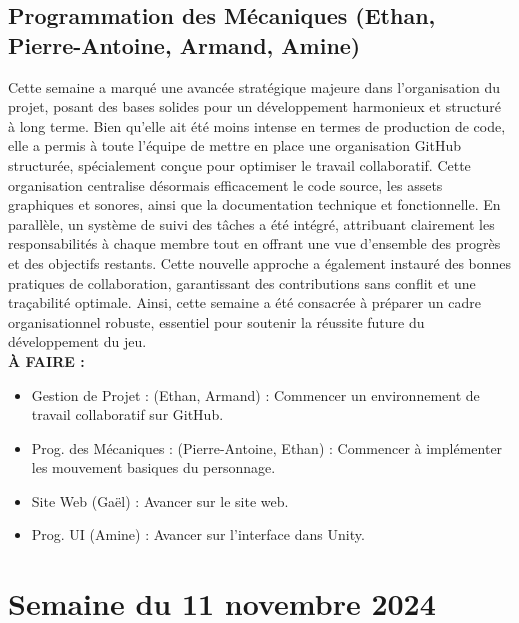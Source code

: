 \documentclass{report}
\begin{document}
\subsection*{Programmation des Mécaniques (Ethan, Pierre-Antoine, Armand, Amine)}
Cette semaine a marqué une avancée stratégique majeure dans l’organisation du projet, posant des bases solides pour un développement harmonieux et structuré à long terme. Bien qu’elle ait été moins intense en termes de production de code, elle a permis à toute l’équipe de mettre en place une organisation GitHub structurée, spécialement conçue pour optimiser le travail collaboratif. Cette organisation centralise désormais efficacement le code source, les assets graphiques et sonores, ainsi que la documentation technique et fonctionnelle. En parallèle, un système de suivi des tâches a été intégré, attribuant clairement les responsabilités à chaque membre tout en offrant une vue d’ensemble des progrès et des objectifs restants. Cette nouvelle approche a également instauré des bonnes pratiques de collaboration, garantissant des contributions sans conflit et une traçabilité optimale. Ainsi, cette semaine a été consacrée à préparer un cadre organisationnel robuste, essentiel pour soutenir la réussite future du développement du jeu.
\\[1cm]
\textbf{À FAIRE :}
\begin{itemize}
    \item Gestion de Projet : (Ethan, Armand) : Commencer un environnement de travail collaboratif sur GitHub.
    \item Prog. des Mécaniques : (Pierre-Antoine, Ethan) : Commencer à implémenter les mouvement basiques du personnage.
    \item Site Web (Gaël) : Avancer sur le site web.
    \item Prog. UI (Amine) : Avancer sur l'interface dans Unity.
\end{itemize}




\newpage
\section{Semaine du 11 novembre 2024}
\end{document}
